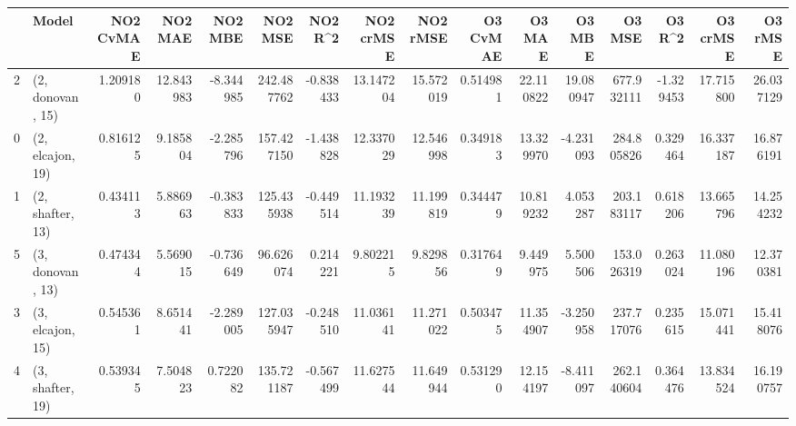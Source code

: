 \begin{tabular}{llrrrrrrrrrrrrrr}
\toprule
{} &             Model &  NO2 CvMAE &    NO2 MAE &   NO2 MBE &     NO2 MSE &   NO2 R\textasciicircum2 &  NO2 crMSE &   NO2 rMSE &  O3 CvMAE &     O3 MAE &     O3 MBE &      O3 MSE &    O3 R\textasciicircum2 &   O3 crMSE &    O3 rMSE \\
\midrule
2 &  (2, donovan, 15) &   1.209180 &  12.843983 & -8.344985 &  242.487762 & -0.838433 &  13.147204 &  15.572019 &  0.514981 &  22.110822 &  19.080947 &  677.932111 & -1.329453 &  17.715800 &  26.037129 \\
0 &  (2, elcajon, 19) &   0.816125 &   9.185804 & -2.285796 &  157.427150 & -1.438828 &  12.337029 &  12.546998 &  0.349183 &  13.329970 &  -4.231093 &  284.805826 &  0.329464 &  16.337187 &  16.876191 \\
1 &  (2, shafter, 13) &   0.434113 &   5.886963 & -0.383833 &  125.435938 & -0.449514 &  11.193239 &  11.199819 &  0.344479 &  10.819232 &   4.053287 &  203.183117 &  0.618206 &  13.665796 &  14.254232 \\
5 &  (3, donovan, 13) &   0.474344 &   5.569015 & -0.736649 &   96.626074 &  0.214221 &   9.802215 &   9.829856 &  0.317649 &   9.449975 &   5.500506 &  153.026319 &  0.263024 &  11.080196 &  12.370381 \\
3 &  (3, elcajon, 15) &   0.545361 &   8.651441 & -2.289005 &  127.035947 & -0.248510 &  11.036141 &  11.271022 &  0.503475 &  11.354907 &  -3.250958 &  237.717076 &  0.235615 &  15.071441 &  15.418076 \\
4 &  (3, shafter, 19) &   0.539345 &   7.504823 &  0.722082 &  135.721187 & -0.567499 &  11.627544 &  11.649944 &  0.531290 &  12.154197 &  -8.411097 &  262.140604 &  0.364476 &  13.834524 &  16.190757 \\
\bottomrule
\end{tabular}
